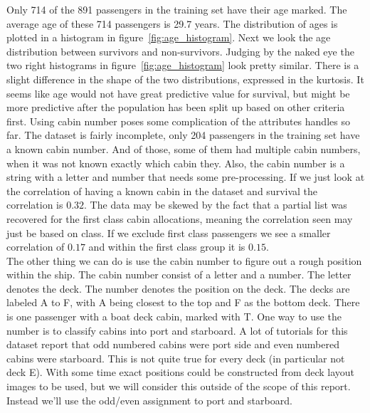 \documentclass{llncs}
\begin{document}
\noindent
Only 714 of the 891 passengers in the training set have their age marked. The average age of these 714 passengers is 29.7 years. The distribution of ages is plotted in a histogram in figure~\ref{fig:age_histogram}. Next we look the age distribution between survivors and non-survivors. Judging by the naked eye the two right histograms in figure~\ref{fig:age_histogram} look pretty similar. There is a slight difference in the shape of the two distributions, expressed in the kurtosis.  It seems like age would not have great predictive value for survival, but might be more predictive after the population has been split up based on other criteria first.
Using cabin number poses some complication of the attributes handles so far. The dataset is fairly incomplete, only 204 passengers in the training set have a known cabin number. And of those, some of them had multiple cabin numbers, when it was not known exactly which cabin they. Also, the cabin number is a string with a letter and number that needs some pre-processing. If we just look at the correlation of having a known cabin in the dataset and survival the correlation is $0.32$.  The data may be skewed by the fact that a partial list was recovered for the first class cabin allocations\cite{cavelist}, meaning the correlation seen may just be based on class. If we exclude first class passengers we see a smaller correlation of $0.17$ and within the first class group it is $0.15$.\\
The other thing we can do is use the cabin number to figure out a rough position within the ship. The cabin number consist of a letter and a number. The letter denotes the deck. The number denotes the position on the deck. The decks are labeled A to F, with A being closest to the top and F as the bottom deck. There is one passenger with a boat deck cabin, marked with T. One way to use the number is to classify cabins into port and starboard. A lot of tutorials for this dataset report that odd numbered cabins were port side and even numbered cabins were starboard. This is not quite true for every deck (in particular not deck E). With some time exact positions could be constructed from deck layout images to be used, but we will consider this outside of the scope of this report. Instead we'll use the odd/even assignment to port and starboard.\\
\end{document}
